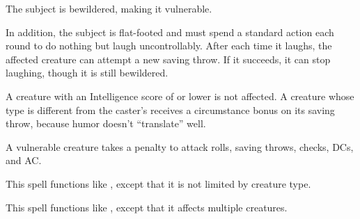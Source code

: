 \spellrng{\rngclose}
\spelldur{\durshort}
\begin{spelleffect}
  The subject is bewildered, making it vulnerable.
\end{spelleffect}
\begin{spellblood}
  In addition, the subject is flat-footed and must spend a standard action each round to do nothing but laugh uncontrollably. After each time it laughs, the affected creature can attempt a new saving throw. If it succeeds, it can stop laughing, though it is still bewildered.
\end{spellblood}
\begin{spellnotes}
  A creature with an Intelligence score of  or lower is not affected. A creature whose type is different from the caster's receives a  circumstance bonus on its saving throw, because humor doesn't ``translate'' well.
\end{spellnotes}
\begin{spellnotes}
  A vulnerable creature takes a  penalty to attack rolls, saving throws, checks, DCs, and AC.
\end{spellnotes}

\spellrng{\rngmed}
\begin{spelleffect}
  This spell functions like , except that it is not limited by creature type.
\end{spelleffect}

\begin{spelleffect}
  This spell functions like , except that it affects multiple creatures.
\end{spelleffect}

